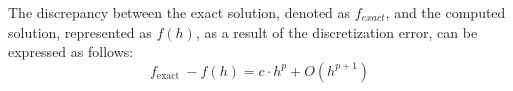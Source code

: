 The discrepancy between the exact solution, denoted as $f_{exact}$, and the computed solution, represented as $f(h)$, as a result of the discretization error, can be expressed as follows:
\begin{equation}
f_{\text {exact }}-f(h)=c \cdot h^p+O\left(h^{p+1}\right)
\end{equation}


